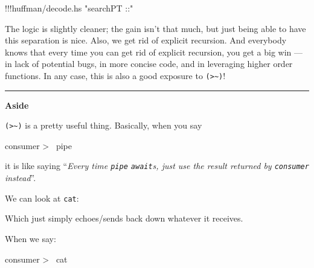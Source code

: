 \documentclass[]{article}
\newenvironment{Shaded}{}{}
\newcommand{\KeywordTok}[1]{\textcolor[rgb]{0.00,0.44,0.13}{\textbf{{#1}}}}
\newcommand{\DataTypeTok}[1]{\textcolor[rgb]{0.56,0.13,0.00}{{#1}}}
\newcommand{\StringTok}[1]{\textcolor[rgb]{0.25,0.44,0.63}{{#1}}}
\newcommand{\OtherTok}[1]{\textcolor[rgb]{0.00,0.44,0.13}{{#1}}}
\newcommand{\FunctionTok}[1]{\textcolor[rgb]{0.02,0.16,0.49}{{#1}}}
\newcommand{\NormalTok}[1]{{#1}}
\begin{document}
\begin{Shaded}
\begin{Highlighting}[]
\FunctionTok{!!!}\NormalTok{huffman}\FunctionTok{/}\NormalTok{decode}\FunctionTok{.}\NormalTok{hs }\StringTok{"searchPT ::"}
\end{Highlighting}
\end{Shaded}

The logic is slightly cleaner; the gain isn't that much, but just being
able to have this separation is nice. Also, we get rid of explicit
recursion. And everybody knows that every time you can get rid of
explicit recursion, you get a big win --- in lack of potential bugs, in
more concise code, and in leveraging higher order functions. In any
case, this is also a good exposure to
\texttt{(\textgreater{}\textasciitilde{})}!

\begin{center}\rule{0.5\linewidth}{\linethickness}\end{center}

\textbf{Aside}

\texttt{(\textgreater{}\textasciitilde{})} is a pretty useful thing.
Basically, when you say

\begin{Shaded}
\begin{Highlighting}[]
\NormalTok{consumer }\FunctionTok{>~} \NormalTok{pipe}
\end{Highlighting}
\end{Shaded}

it is like saying ``\emph{Every time \texttt{pipe} \texttt{await}s, just
use the result returned by \texttt{consumer} instead}''.

We can look at \texttt{cat}:

\begin{Shaded}
\end{Shaded}

Which just simply echoes/sends back down whatever it receives.

When we say:

\begin{Shaded}
\begin{Highlighting}[]
\NormalTok{consumer }\FunctionTok{>~} \NormalTok{cat}
\end{Highlighting}
\end{Shaded}
\end{document}
